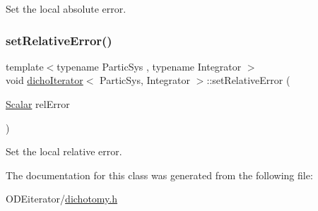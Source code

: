 Set the local absolute error. 

\mbox{\label{classdicho_iterator_a2e810ce79342069faafde863d4876ce4}} 
\subsubsection{\texorpdfstring{set\+Relative\+Error()}{setRelativeError()}}
{\footnotesize\ttfamily template$<$typename Partic\+Sys , typename Integrator $>$ \\
void \mbox{\hyperlink{classdicho_iterator}{dicho\+Iterator}}$<$ Partic\+Sys, Integrator $>$\+::set\+Relative\+Error (\begin{DoxyParamCaption}\item[{\mbox{\hyperlink{classdicho_iterator_a292e986136313822f21b1b60d9cbb95d}{Scalar}}}]{rel\+Error }\end{DoxyParamCaption})\hspace{0.3cm}{\ttfamily [inline]}}



Set the local relative error. 



The documentation for this class was generated from the following file\+:\begin{DoxyCompactItemize}
\item 
O\+D\+Eiterator/\mbox{\hyperlink{dichotomy_8h}{dichotomy.\+h}}\end{DoxyCompactItemize}
